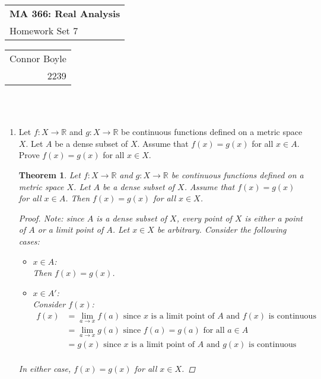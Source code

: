 \documentclass{amsart}
\def\name{Connor Boyle} %
\def\CM{2239} %
\def\hwnum{7} %
\newtheorem{theorem}{Theorem}
\begin{document}
    \noindent
    \thispagestyle{firststyle}
    \begin{tabular}{l}
    {\LARGE \textbf{MA 366: Real Analysis} }\\
    {\Large Homework Set \hwnum}
    \end{tabular} \hfill \begin{tabular}{r}
                            \name \\
                            \CM
                            \end{tabular}
    
    \noindent \hrulefill \\\\
    \begin{enumerate}[1.]
    \item Let $f : X \to \mathbb{R}$ and $g: X \to \mathbb{R}$ be continuous functions defined on a metric space $X$. Let $A$ be a dense subset of $X$. Assume that $f(x) = g(x)$ for all $x \in A$. Prove $f(x) = g(x)$ for all $x \in X$.
    \begin{theorem}
        Let $f : X \to \mathbb{R}$ and $g: X \to \mathbb{R}$ be continuous functions defined on a metric space $X$. Let $A$ be a dense subset of $X$. Assume that $f(x) = g(x)$ for all $x \in A$. Then $f(x) = g(x)$ for all $x \in X$.
        \begin{proof}
            Note: since $A$ is a dense subset of $X$, every point of $X$ is either a point of $A$ or a limit point of $A$.
            Let $x \in X$ be arbitrary. Consider the following cases:
            \begin{itemize}
                \item $x \in A$: \\
                    Then $f(x) = g(x)$.
                \item $x \in A'$: \\
                    Consider $f(x)$:
                    \begin{align*}
                        f(x) &= \lim_{a \to x} f(a) \text{ since $x$ is a limit point of $A$ and $f(x)$ is continuous}\\
                        &= \lim_{a \to x} g(a) \text{ since $f(a) = g(a)$ for all $a \in A$} \\
                        &= g(x) \text{ since $x$ is a limit point of $A$ and $g(x)$ is continuous}\\
                    \end{align*}
            \end{itemize}
            In either case, $f(x) = g(x)$ for all $x \in X$.
        \end{proof}
    \end{theorem}
    

\end{enumerate}
\end{document}
